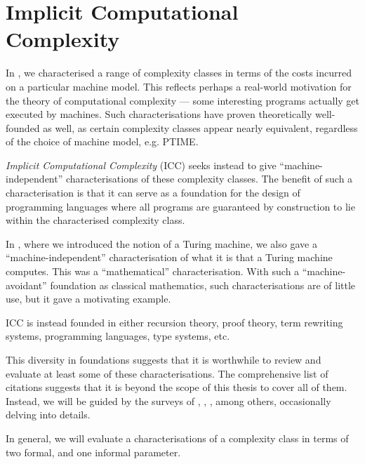 \chapter{Implicit Computational Complexity} \label{sec:icc}

In , we characterised a range of complexity
classes in terms of the costs incurred on a particular machine model. This
reflects perhaps a real-world motivation for the theory of computational
complexity --- some interesting programs actually get executed by machines.
Such characterisations have proven theoretically well-founded as well, as
certain complexity classes appear nearly equivalent, regardless of the choice
of machine model, e.g. PTIME.

\emph{Implicit Computational Complexity} (ICC) seeks instead to give
``machine-independent'' characterisations of these complexity classes.  The
benefit of such a characterisation is that it can serve as a foundation for the
design of programming languages where all programs are guaranteed by
construction to lie within the characterised complexity class.

In , where we introduced the notion of a Turing machine,
we also gave a ``machine-independent'' characterisation of what it is that a
Turing machine computes. This was a ``mathematical'' characterisation. With
such a ``machine-avoidant'' foundation as classical mathematics, such
characterisations are of little use, but it gave a motivating example.

ICC is instead founded in either recursion theory\cite{cobham-1965,
bellantoni-cook-1992, leivant-1995, marion-2009}, proof
theory\cite{girard-scedorov-scott-1992, leivant-1994, girard-1998,
asperti-roversi-2002, lafont-2004, dal-lago-hofmann-2010}, term rewriting
systems\cite{beckmann-weiermann-1996, bonfante-et-al-1999, avanzini-et-al-2012,
de-carvalho-simonsen-2014}, programming
languages\cite{voda-1994,jones-1999,kristiansen-niggl-2004,kristiansen-2005}, type
systems\cite{hofmann-2000b, crary-weirich-2000}, etc.

This diversity in foundations suggests that it is worthwhile to review and
evaluate  at least some of these characterisations. The comprehensive list of
citations suggests that it is beyond the scope of this thesis to cover all of
them. Instead, we will be guided by the surveys of \cite{clote-1999},
\cite{hofmann-2000a}, \cite{dal-lago-2012}, among others, occasionally delving
into details.

In general, we will evaluate a characterisations of a complexity class in terms
of two formal, and one informal parameter.

